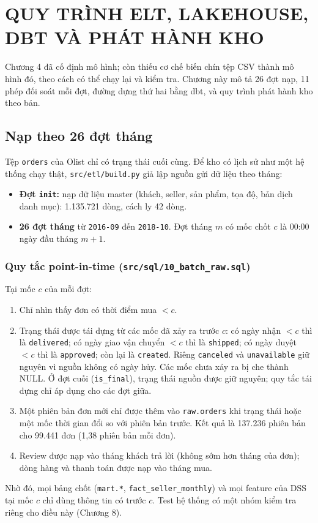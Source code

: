 \section{QUY TRÌNH ELT, LAKEHOUSE, DBT VÀ PHÁT HÀNH KHO}
\suppressfloats[t]

Chương 4 đã cố định mô hình; còn thiếu cơ chế biến chín tệp CSV thành mô hình đó, theo cách có thể chạy lại và kiểm tra. Chương này mô tả 26 đợt nạp, 11 phép đối soát mỗi đợt, đường dựng thứ hai bằng dbt, và quy trình phát hành kho theo bản.

\subsection{Nạp theo 26 đợt tháng}
Tệp \texttt{orders} của Olist chỉ có trạng thái cuối cùng. Để kho có lịch sử như một hệ thống chạy thật, \texttt{src/etl/build.py} giả lập nguồn gửi dữ liệu theo tháng:
\begin{itemize}
    \item \textbf{Đợt \texttt{init}:} nạp dữ liệu master (khách, seller, sản phẩm, tọa độ, bản dịch danh mục): 1.135.721 dòng, cách ly 42 dòng.
    \item \textbf{26 đợt tháng} từ \texttt{2016-09} đến \texttt{2018-10}. Đợt tháng $m$ có mốc chốt $c$ là 00:00 ngày đầu tháng $m+1$.
\end{itemize}

\subsubsection*{Quy tắc point-in-time (\texttt{src/sql/10\_batch\_raw.sql})}
Tại mốc $c$ của mỗi đợt:
\begin{enumerate}
    \item Chỉ nhìn thấy đơn có thời điểm mua $< c$.
    \item Trạng thái được tái dựng từ các mốc đã xảy ra trước $c$: có ngày nhận $< c$ thì là \texttt{delivered}; có ngày giao vận chuyển $< c$ thì là \texttt{shipped}; có ngày duyệt $< c$ thì là \texttt{approved}; còn lại là \texttt{created}. Riêng \texttt{canceled} và \texttt{unavailable} giữ nguyên vì nguồn không có ngày hủy. Các mốc chưa xảy ra bị che thành NULL. Ở đợt cuối (\texttt{is\_final}), trạng thái nguồn được giữ nguyên; quy tắc tái dựng chỉ áp dụng cho các đợt giữa.
    \item Một phiên bản đơn mới chỉ được thêm vào \texttt{raw.orders} khi trạng thái hoặc một mốc thời gian đổi so với phiên bản trước. Kết quả là 137.236 phiên bản cho 99.441 đơn (1,38 phiên bản mỗi đơn).
    \item Review được nạp vào tháng khách trả lời (không sớm hơn tháng của đơn); dòng hàng và thanh toán được nạp vào tháng mua.
\end{enumerate}
Nhờ đó, mọi bảng chốt (\texttt{mart.*}, \texttt{fact\_seller\_monthly}) và mọi feature của DSS tại mốc $c$ chỉ dùng thông tin có trước $c$. Test hệ thống có một nhóm kiểm tra riêng cho điều này (Chương 8).

